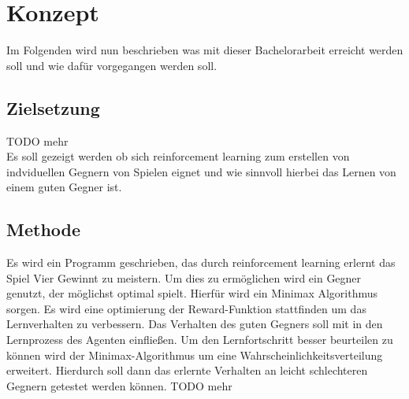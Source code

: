 \chapter{Konzept}%

\label{cha:Konzept}

Im Folgenden wird nun beschrieben was mit dieser Bachelorarbeit erreicht werden soll und wie dafür vorgegangen werden soll.

\section{Zielsetzung}
\colorbox{red!30}{TODO mehr}\\
Es soll gezeigt werden ob sich reinforcement learning zum erstellen von indviduellen Gegnern von Spielen eignet und wie sinnvoll hierbei das Lernen von einem guten Gegner ist. \\

\section{Methode}
Es wird ein Programm geschrieben, das durch reinforcement learning erlernt das Spiel Vier Gewinnt zu meistern. Um dies zu ermöglichen wird ein Gegner genutzt, der möglichst optimal spielt. Hierfür wird ein Minimax Algorithmus sorgen. Es wird eine optimierung der Reward-Funktion stattfinden um das Lernverhalten zu verbessern. Das Verhalten des guten Gegners soll mit in den Lernprozess des Agenten einfließen. Um den Lernfortschritt besser beurteilen zu können wird der Minimax-Algorithmus um eine Wahrscheinlichkeitsverteilung erweitert. Hierdurch soll dann das erlernte Verhalten an leicht schlechteren Gegnern getestet werden können.
\colorbox{red!30}{TODO mehr}

